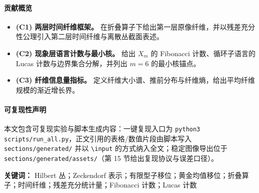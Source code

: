 \begin{abstract}
设基空间 $M$ 上存在 Hilbert 丛 $\Pi:\mathcal H\to M$，其典型纤维为无限维可分复 Hilbert 空间 $\mathfrak H$。本文在固定分辨率参数 $m$ 下，引入有限观测语言 $X_m\subset\{0,1\}^m$（禁止子词 $11$），并设观测投影 $\pi_m:\mathcal H\to X_m$。在有限窗离散化模型中，定义本体窗口 $\Omega_m=\{0,1\}^m$ 及折叠算子 $\Fold_m:\Omega_m\twoheadrightarrow X_m$，将任意窗口配置规范化为满足 Zeckendorf 约束的稳定词。由此得到第一层时间纤维 $\mathcal F_m(x)=\Fold_m^{-1}(x)$，并定义纤维大小谱、推前分布及纤维熵以量化观测压缩的隐藏自由度。进一步提出第二层时间纤维：对每个 $x\in X_m$ 设有限残差纤维 $R_m(x)$，构成离散丛 $E_m=\bigsqcup_{x\in X_m}(\{x\}\times R_m(x))$，并给出“有限残差充分性”公理，使得分辨率 $m$ 下的可观测态可由截面 $s_m:M\to E_m$ 确定。本文将“空间显示维数/显示字典”的确定视为一个 \textsf{[CAP]} 闭包输出，并采用默认三维显示以支持后续的回路/holonomy 诊断与空间实验。本文同时建立现象层语言的组合结构：$\abs{X_m}=F_{m+2}$，循环子语言 $\abs{C_m}=L_m$，并得分解 $X_m=C_m\sqcup B_m$ 与 $\abs{B_m}=F_{m-2}$，其中 $m=6$ 的最小核满足 $\abs{\Omega_6}=64$、$\abs{X_6}=21=18\oplus 3$。纤维丛的局部平凡化定义参照标准文献。\cite{cohen_fiber_bundles}
\end{abstract}

\paragraph{贡献概览}
\begin{itemize}
  \item \textbf{(C1) 两层时间纤维框架。} 在折叠算子下给出第一层原像纤维，并以残差充分性公理引入第二层时间纤维与离散丛截面表述。
  \item \textbf{(C2) 现象层语言计数与最小核。} 给出 $X_m$ 的 Fibonacci 计数、循环子语言的 Lucas 计数与边界集合分解，并列出 $m=6$ 的最小核锚点。
  \item \textbf{(C3) 纤维信息量指标。} 定义纤维大小谱、推前分布与纤维熵，给出平均纤维规模的渐近增长界。
\end{itemize}

\paragraph{可复现性声明}
本文包含可复现实验与脚本生成内容：一键复现入口为 \texttt{python3 scripts/run\_all.py}，正文引用的表格/数值片段由脚本写入 \texttt{sections/generated/} 并以 \texttt{\textbackslash input} 的方式纳入全文；稳定图像导出位于 \texttt{sections/generated/assets/}（第 15 节给出复现协议与误差口径）。

\begin{sloppypar}
\textbf{关键词：} Hilbert 丛；Zeckendorf 表示；有限型子移位；黄金均值移位；折叠算子；时间纤维；残差充分统计量；Fibonacci 计数；Lucas 计数
\end{sloppypar}
